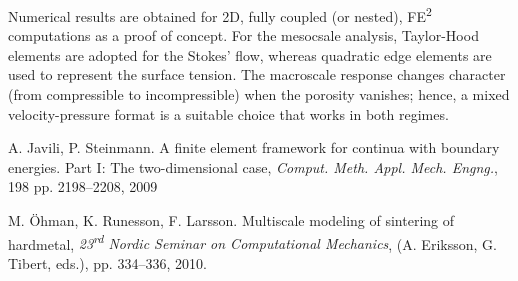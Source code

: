 \documentclass{article}
\begin{document}
Numerical results are obtained for 2D, fully coupled (or nested), FE\textsuperscript{2} computations as a proof of concept.
For the mesocsale analysis, Taylor-Hood elements are adopted for the Stokes' flow, whereas quadratic edge elements are used to represent the surface tension.
The macroscale response changes character (from compressible to incompressible) when the porosity vanishes; hence, a mixed velocity-pressure format is a suitable choice that works in both regimes.


\begin{thebibliography}{99}
\normalsize

A. Javili, P. Steinmann.
A finite element framework for continua with boundary energies. Part I: The two-dimensional case,
\textit{Comput. Meth. Appl. Mech. Engng.},
198 pp. 2198--2208,
2009

M. Öhman, K. Runesson, F. Larsson.
Multiscale modeling of sintering of hardmetal,
\textit{23\textsuperscript{rd} Nordic Seminar on Computational Mechanics}, (A. Eriksson, G. Tibert, eds.), pp. 334--336, 2010.
\end{thebibliography}
\end{document}
